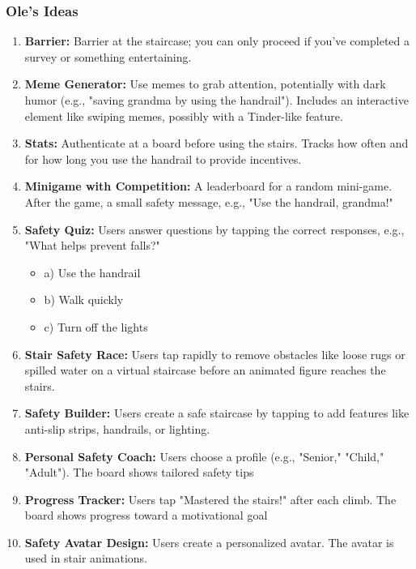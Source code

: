 \documentclass{article}
\begin{document}
\subsubsection{Ole's Ideas}
\begin{enumerate}
    \item \textbf{Barrier:}
        Barrier at the staircase; you can only proceed if you've completed a survey or something entertaining.
    \item \textbf{Meme Generator:}
        Use memes to grab attention, potentially with dark humor (e.g., "saving grandma by using the handrail"). Includes an interactive element like swiping memes, possibly with a Tinder-like feature.
    \item \textbf{Stats:}
        Authenticate at a board before using the stairs. Tracks how often and for how long you use the handrail to provide incentives.
    \item \textbf{Minigame with Competition:}
        A leaderboard for a random mini-game. After the game, a small safety message, e.g., "Use the handrail, grandma!"
    \item \textbf{Safety Quiz:}
        Users answer questions by tapping the correct responses, e.g., "What helps prevent falls?"
        \begin{itemize}
            \item a) Use the handrail
            \item b) Walk quickly
            \item c) Turn off the lights
        \end{itemize}
    \item \textbf{Stair Safety Race:}
        Users tap rapidly to remove obstacles like loose rugs or spilled water on a virtual staircase before an animated figure reaches the stairs.
    \item \textbf{Safety Builder:}
        Users create a safe staircase by tapping to add features like anti-slip strips, handrails, or lighting.
    \item \textbf{Personal Safety Coach:}
        Users choose a profile (e.g., "Senior," "Child," "Adult"). The board shows tailored safety tips
    \item \textbf{Progress Tracker:}
        Users tap "Mastered the stairs!" after each climb. The board shows progress toward a motivational goal
    \item \textbf{Safety Avatar Design:}
        Users create a personalized avatar. The avatar is used in stair animations.
\end{enumerate}
\end{document}
